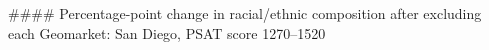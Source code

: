 #### Percentage-point change in racial/ethnic composition after excluding each Geomarket: San Diego, PSAT score 1270–1520
